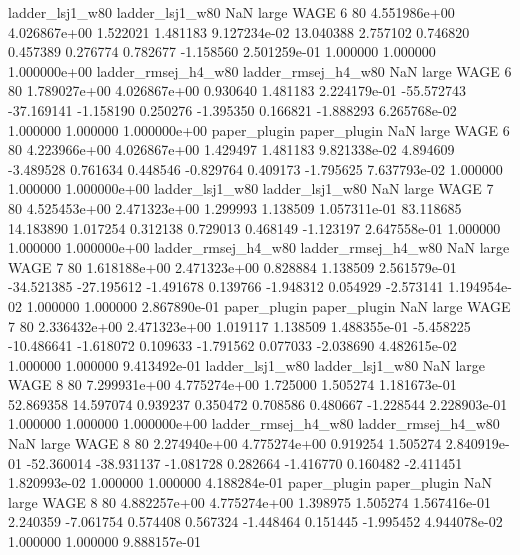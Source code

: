     ladder_lsj1_w80     ladder_lsj1_w80                   NaN      large     WAGE                 6 80 4.551986e+00   4.026867e+00      1.522021       1.481183  9.127234e-02     13.040388      2.757102     0.746820       0.457389  0.276774   0.782677    -1.158560   2.501259e-01            1.000000        1.000000        1.000000e+00
ladder_rmsej_h4_w80 ladder_rmsej_h4_w80                   NaN      large     WAGE                 6 80 1.789027e+00   4.026867e+00      0.930640       1.481183  2.224179e-01    -55.572743    -37.169141    -1.158190       0.250276 -1.395350   0.166821    -1.888293   6.265768e-02            1.000000        1.000000        1.000000e+00
       paper_plugin        paper_plugin                   NaN      large     WAGE                 6 80 4.223966e+00   4.026867e+00      1.429497       1.481183  9.821338e-02      4.894609     -3.489528     0.761634       0.448546 -0.829764   0.409173    -1.795625   7.637793e-02            1.000000        1.000000        1.000000e+00
    ladder_lsj1_w80     ladder_lsj1_w80                   NaN      large     WAGE                 7 80 4.525453e+00   2.471323e+00      1.299993       1.138509  1.057311e-01     83.118685     14.183890     1.017254       0.312138  0.729013   0.468149    -1.123197   2.647558e-01            1.000000        1.000000        1.000000e+00
ladder_rmsej_h4_w80 ladder_rmsej_h4_w80                   NaN      large     WAGE                 7 80 1.618188e+00   2.471323e+00      0.828884       1.138509  2.561579e-01    -34.521385    -27.195612    -1.491678       0.139766 -1.948312   0.054929    -2.573141   1.194954e-02            1.000000        1.000000        2.867890e-01
       paper_plugin        paper_plugin                   NaN      large     WAGE                 7 80 2.336432e+00   2.471323e+00      1.019117       1.138509  1.488355e-01     -5.458225    -10.486641    -1.618072       0.109633 -1.791562   0.077033    -2.038690   4.482615e-02            1.000000        1.000000        9.413492e-01
    ladder_lsj1_w80     ladder_lsj1_w80                   NaN      large     WAGE                 8 80 7.299931e+00   4.775274e+00      1.725000       1.505274  1.181673e-01     52.869358     14.597074     0.939237       0.350472  0.708586   0.480667    -1.228544   2.228903e-01            1.000000        1.000000        1.000000e+00
ladder_rmsej_h4_w80 ladder_rmsej_h4_w80                   NaN      large     WAGE                 8 80 2.274940e+00   4.775274e+00      0.919254       1.505274  2.840919e-01    -52.360014    -38.931137    -1.081728       0.282664 -1.416770   0.160482    -2.411451   1.820993e-02            1.000000        1.000000        4.188284e-01
       paper_plugin        paper_plugin                   NaN      large     WAGE                 8 80 4.882257e+00   4.775274e+00      1.398975       1.505274  1.567416e-01      2.240359     -7.061754     0.574408       0.567324 -1.448464   0.151445    -1.995452   4.944078e-02            1.000000        1.000000        9.888157e-01